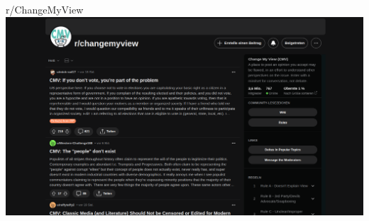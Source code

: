 \documentclass[compress,12pt]{beamer}
\begin{document}
    \begin{frame}{r/ChangeMyView}
        \includegraphics[width=\textwidth]{../images/Screenshot_2024-04-22-15-24-35_1920x1080}
    \end{frame}
\end{document}
